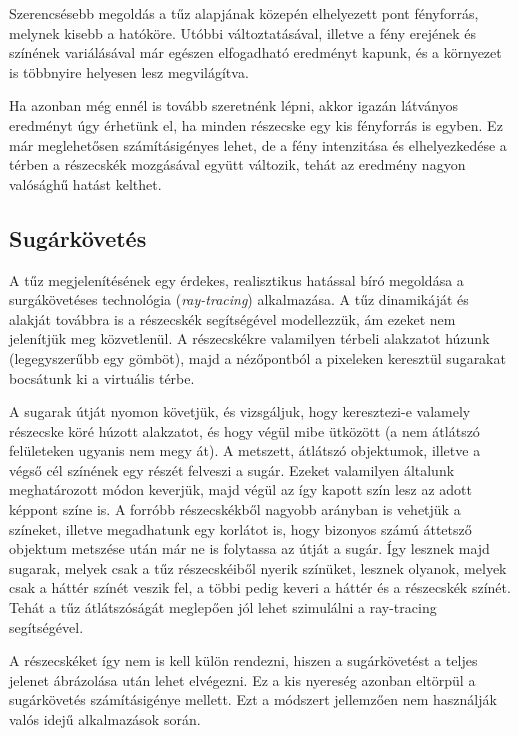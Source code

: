 Szerencsésebb megoldás a tűz alapjának közepén elhelyezett pont fényforrás, melynek kisebb a hatóköre. Utóbbi változtatásával, illetve a fény erejének és színének variálásával már egészen elfogadható eredményt kapunk, és a környezet is többnyire helyesen lesz megvilágítva.

Ha azonban még ennél is tovább szeretnénk lépni, akkor igazán látványos eredményt úgy érhetünk el, ha minden részecske egy kis fényforrás is egyben. Ez már meglehetősen számításigényes lehet, de a fény intenzitása és elhelyezkedése a térben a részecskék mozgásával együtt változik, tehát az eredmény nagyon valósághű hatást kelthet.

\subsection{Sugárkövetés}
A tűz megjelenítésének egy érdekes, realisztikus hatással bíró megoldása a surgákövetéses technológia (\textit{ray-tracing}) alkalmazása. A tűz dinamikáját és alakját továbbra is a részecskék segítségével modellezzük, ám ezeket nem jelenítjük meg közvetlenül. A részecskékre valamilyen térbeli alakzatot húzunk (legegyszerűbb egy gömböt), majd a nézőpontból a pixeleken keresztül sugarakat bocsátunk ki a virtuális térbe. 

A sugarak útját nyomon követjük, és vizsgáljuk, hogy keresztezi-e valamely részecske köré húzott alakzatot, és hogy végül mibe ütközött (a nem átlátszó felületeken ugyanis nem megy át). A metszett, átlátszó objektumok, illetve a végső cél színének egy részét felveszi a sugár. Ezeket valamilyen általunk meghatározott módon keverjük, majd végül az így kapott szín lesz az adott képpont színe is. A forróbb részecskékből nagyobb arányban is vehetjük a színeket, illetve megadhatunk egy korlátot is, hogy bizonyos számú áttetsző objektum metszése után már ne is folytassa az útját a sugár. Így lesznek majd sugarak, melyek csak a tűz részecskéiből nyerik színüket, lesznek olyanok, melyek csak a háttér színét veszik fel, a többi pedig keveri a háttér és a részecskék színét. Tehát a tűz átlátszóságát meglepően jól lehet szimulálni a ray-tracing segítségével. 

A részecskéket így nem is kell külön rendezni, hiszen a sugárkövetést a teljes jelenet ábrázolása után lehet elvégezni. Ez a kis nyereség azonban eltörpül a sugárkövetés számításigénye mellett. Ezt a módszert jellemzően nem használják valós idejű alkalmazások során.

















